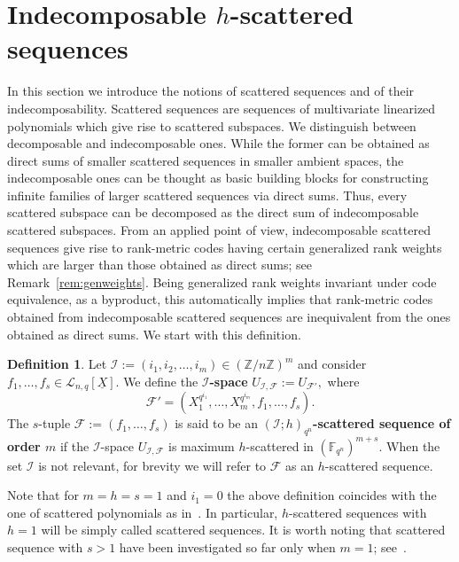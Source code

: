 \documentclass[11pt]{article}
\theoremstyle{definition}
\newtheorem{defi}[theo]{Definition}
\numberwithin{equation}{section}
\begin{document}
\section{Indecomposable \texorpdfstring{$h$}{h}-scattered sequences}\label{sec:scattered_sequences}
{In this section we introduce the notions of scattered sequences and of their indecomposability. Scattered sequences are sequences of multivariate linearized polynomials which give rise to scattered subspaces. We distinguish between decomposable and indecomposable ones. While the former can be obtained as direct sums of smaller scattered sequences in smaller ambient spaces, the indecomposable ones can be thought as basic building blocks for constructing infinite families of larger scattered sequences via direct sums. Thus, every scattered subspace can be decomposed as the direct sum of indecomposable scattered subspaces. From an applied point of view, indecomposable scattered sequences give rise to rank-metric codes having certain generalized rank weights which are larger than those obtained as direct sums; see Remark~\ref{rem:genweights}. Being generalized rank weights invariant under code equivalence, as a byproduct, this automatically implies that rank-metric codes obtained from indecomposable scattered sequences are inequivalent from the ones obtained as direct sums.}
We start with this definition.
\begin{defi}\label{Def:ScatteredSequence}
Let $\mathcal I:=(i_1, i_2,\ldots, i_m) \in (\mathbb{Z}/n\mathbb{Z})^m$ and consider $f_1,\ldots,f_s\in \mathcal{L}_{n,q}[\underline{X}]$. We define the \textbf{$\mathcal I$-space}
$U_{\mathcal I,\mathcal{F}}:=U_{\mathcal{F}'},$
where
$$\mathcal F'=(X_1^{q^{i_1}},\ldots, X_m^{q^{i_m}}, f_1,\ldots, f_s).$$
The $s$-tuple $\mathcal{F}:=(f_1,\ldots,f_s)$ is said to be an \textbf{$(\mathcal I;h)_{q^n}$-scattered sequence of order $m$} if the $\mathcal I$-space
$U_{\mathcal I,\mathcal{F}}$
is maximum $h$-scattered in $(\mathbb{F}_{q^n})^{m+s}$. When the set $\mathcal I$ is not relevant, for brevity we will refer to $\mathcal F$ as an $h$-scattered sequence.
\end{defi}

Note that for $m=h=s=1$ and $i_1=0$ the above definition coincides with the one of scattered polynomials as in~\cite{sheekey2016new}. In particular, $h$-scattered sequences with $h=1$ will be simply called scattered sequences. It is worth noting that scattered sequence with $s>1$  have been investigated so far only when $m=1$; see~\cite{BARTOLI2020105281,bartoli2021linear}.
\end{document}
